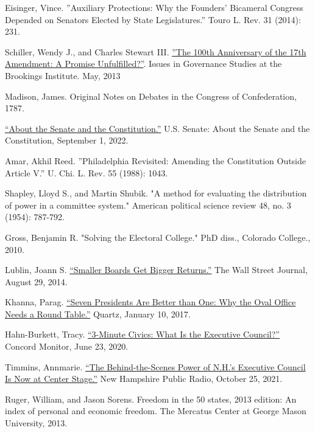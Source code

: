 \documentclass{article}
\begin{document}
\begin{thebibliography}{20}
Eisinger, Vince. ”Auxiliary Protections: Why the Founders' Bicameral Congress Depended on Senators Elected by State Legislatures.” Touro L. Rev. 31 (2014): 231.

Schiller, Wendy J., and Charles Stewart III. \href{https://www.brookings.edu/wp-content/uploads/2016/06/Schiller_17th-Amendment_v7.pdf}{”The 100th Anniversary of the 17th Amendment: A Promise Unfulfilled?”}. Issues in Governance Studies at the Brookings Institute. May, 2013

Madison, James. Original Notes on Debates in the Congress of Confederation, 1787.

\href{https://www.senate.gov/about/origins-foundations/senate-and-constitution.htm}{“About the Senate and the Constitution.”} U.S. Senate: About the Senate and the Constitution, September 1, 2022.

Amar, Akhil Reed. ”Philadelphia Revisited: Amending the Constitution Outside Article V.” U. Chi. L. Rev. 55 (1988): 1043.

Shapley, Lloyd S., and Martin Shubik. "A method for evaluating the distribution of power in a committee system." American political science review 48, no. 3 (1954): 787-792.

Gross, Benjamin R. "Solving the Electoral College." PhD diss., Colorado College., 2010.

Lublin, Joann S. \href{https://www.wsj.com/articles/smaller-boards-get-bigger-returns-1409078628}{“Smaller Boards Get Bigger Returns.”} The Wall Street Journal, August 29, 2014. 

Khanna, Parag. \href{https://qz.com/876260/seven-presidents-are-better-than-one-why-the-oval-office-needs-a-round-table}{“Seven Presidents Are Better than One: Why the Oval Office Needs a Round Table.”} Quartz, January 10, 2017.

Hahn-Burkett, Tracy. \href{https://www.concordmonitor.com/What-is-the-Executive-Council-34817477}{“3-Minute Civics: What Is the Executive Council?”} Concord Monitor, June 23, 2020.

Timmins, Annmarie. \href{https://www.nhpr.org/nh-news/2021-10-25/executive-council}{“The Behind-the-Scenes Power of N.H.’s Executive Council Is Now at Center Stage.”} New Hampshire Public Radio, October 25, 2021. 

Ruger, William, and Jason Sorens. Freedom in the 50 states, 2013 edition: An index of personal and economic freedom. The Mercatus Center at George Mason University, 2013.


\end{thebibliography}
\end{document}
